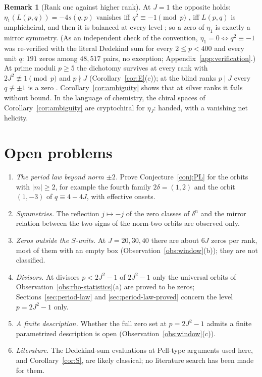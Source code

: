 \documentclass[11pt]{article}
\theoremstyle{definition}
\newtheorem{remark}[theorem]{Remark}
\begin{document}
\begin{remark}[Rank one against higher rank]
\label{rem:rank-one}
At $J=1$ the opposite holds: $\eta_1(L(p,q))=-4s(q,p)$ vanishes iff
$q^2\equiv-1\pmod p$ \cite[p.~36]{RademacherGrosswald1972}, iff $L(p,q)$
is amphicheiral, and then it is balanced at every level
\cite[Cor.~4.4]{LensChirality2026}; so a zero of $\eta_1$ is exactly a
mirror symmetry.  (As an independent check of the convention,
$\eta_1=0\iff q^2\equiv-1$ was re-verified with the literal Dedekind sum
for every $2\leq p<400$ and every unit $q$: $191$ zeros among $48{,}517$
pairs, no exception; Appendix~\ref{app:verification}.)  At prime moduli
$p\geq5$ the dichotomy survives at every rank with $2J^2\not\equiv1\pmod p$
and $p\nmid J$ (Corollary~\ref{cor:E}(c)); at the blind ranks $p\mid J$
every $q\not\equiv\pm1$ is a zero \cite[Cor.~6.4(d)]{LensChirality2026}.  Corollary~\ref{cor:ambiguity} shows that at
silver ranks it fails without bound.  In the language of chemistry, the
chiral spaces of Corollary~\ref{cor:ambiguity} are cryptochiral for
$\eta_J$: handed, with a vanishing net helicity.
\end{remark}

\section{Open problems}
\label{sec:open}

\begin{enumerate}[label=(\arabic*)]
\item \emph{The period law beyond norm $\pm2$.}  Prove
Conjecture~\ref{conj:PL} for the orbits with $|m|\geq2$, for example the
fourth family $2\delta=(1,2)$ and the orbit $(1,-3)$ of $q\equiv4-4J$,
with effective onsets.
\item \emph{Symmetries.}  The reflection $j\mapsto-j$ of the zero classes
of $\delta^n$ and the mirror relation between the two signs of the
norm-two orbits are observed only.
\item \emph{Zeros outside the $S$-units.}  At $J=20,30,40$ there are about
$6J$ zeros per rank, most of them with an empty box
(Observation~\ref{obs:window}(b)); they are not classified.
\item \emph{Divisors.}  At divisors $p<2J^2-1$ of $2J^2-1$ only the
universal orbits of Observation~\ref{obs:rho-statistics}(a) are proved to
be zeros; Sections~\ref{sec:period-law} and \ref{sec:period-law-proved}
concern the level $p=2J^2-1$ only.
\item \emph{A finite description.}  Whether the full zero set at
$p=2J^2-1$ admits a finite parametrized description is open
(Observation~\ref{obs:window}(c)).
\item \emph{Literature.}  The Dedekind-sum evaluations at Pell-type
arguments used here, and Corollary~\ref{cor:S}, are likely classical;
no literature search has been made for them.
\end{enumerate}
\end{document}
